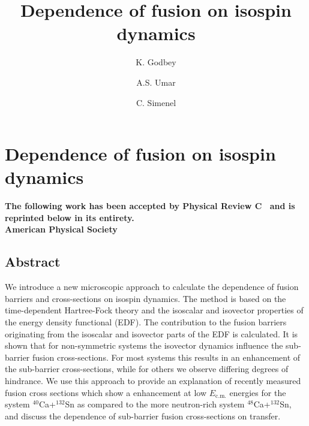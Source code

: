 
\chapter{Dependence of fusion on isospin dynamics}\label{chapters:chapter_2}

\title{Dependence of fusion on isospin dynamics}

\author[1]{K. Godbey}
\author[1]{A.S. Umar}
\author[2]{C. Simenel}

{
\bfseries\centering
The following work has been accepted by Physical Review C~\citep{godbey2017} and is reprinted below in its entirety.\\
 American Physical Society
\makeatletter
	\begin{center}\large\bfseries
	\@title
	\par\end{center}
\begin{center}
	\AB@authlist
	\AB@affillist
\end{center}
\makeatother
}
\makeatletter
\renewcommand{\AB@affillist}{}
\renewcommand{\AB@authlist}{}
\setcounter{authors}{0}
\setcounter{affil}{0}
\makeatother

\section*{Abstract}
	We introduce a new microscopic approach to calculate the dependence of fusion barriers and cross-sections on
	isospin dynamics. The method is based on the time-dependent Hartree-Fock theory and
	the isoscalar and isovector properties of the energy density functional (EDF). The contribution to
	the fusion barriers originating from the isoscalar and isovector parts of the EDF is calculated.
	It is shown that for non-symmetric systems the isovector dynamics influence the sub-barrier fusion
	cross-sections. For most systems this results in an enhancement of the sub-barrier cross-sections,
	while for others we observe differing degrees of hindrance.
	We use this approach to provide an explanation of recently measured fusion cross sections which show a  enhancement at low $E_\mathrm{c.m.}$ energies
	for the system $^{40}$Ca+$^{132}$Sn as compared to the more neutron-rich system
	$^{48}$Ca+$^{132}$Sn, and discuss the dependence of sub-barrier fusion cross-sections on transfer.
	
